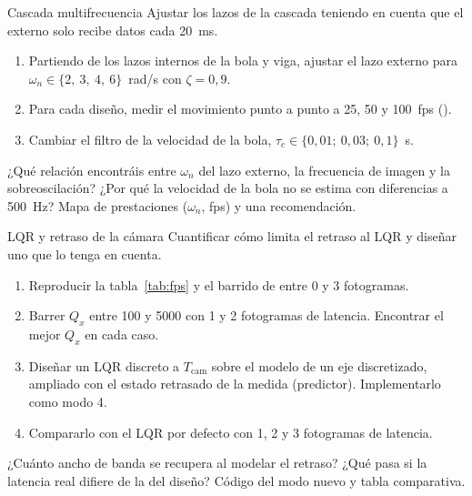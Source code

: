 \label{pr:cascada}
\begin{practica}{Cascada multifrecuencia}
\objetivos Ajustar los lazos de la cascada teniendo en cuenta que el externo solo recibe datos cada \SI{20}{ms}.
\procedimiento
\begin{enumerate}
  \item Partiendo de los lazos internos de la bola y viga, ajustar el lazo externo para $\omega_n\in\{2,\ 3,\ 4,\ 6\}$~rad/s con $\zeta=0{,}9$.
  \item Para cada diseño, medir el movimiento punto a punto a 25, 50 y \SI{100}{fps} ().
  \item Cambiar el filtro de la velocidad de la bola, $\tau_c\in\{0{,}01;\ 0{,}03;\ 0{,}1\}$~s.
\end{enumerate}
\preguntas ¿Qué relación encontráis entre $\omega_n$ del lazo externo, la frecuencia de imagen y la sobreoscilación? ¿Por qué la velocidad de la bola no se estima con diferencias a \SI{500}{Hz}?
\entregables Mapa de prestaciones ($\omega_n$, fps) y una recomendación.
\end{practica}

\label{pr:retraso}
\begin{practica}{LQR y retraso de la cámara}
\objetivos Cuantificar cómo limita el retraso al LQR y diseñar uno que lo tenga en cuenta.
\procedimiento
\begin{enumerate}
  \item Reproducir la tabla~\ref{tab:fps} y el barrido de  entre 0 y 3 fotogramas.
  \item Barrer $Q_x$ entre 100 y 5000 con 1 y 2 fotogramas de latencia. Encontrar el mejor $Q_x$ en cada caso.
  \item Diseñar un LQR discreto a $T_{\text{cam}}$ sobre el modelo de un eje discretizado, ampliado con el estado retrasado de la medida (predictor). Implementarlo como modo 4.
  \item Compararlo con el LQR por defecto con 1, 2 y 3 fotogramas de latencia.
\end{enumerate}
\preguntas ¿Cuánto ancho de banda se recupera al modelar el retraso? ¿Qué pasa si la latencia real difiere de la del diseño?
\entregables Código del modo nuevo y tabla comparativa.
\end{practica}

